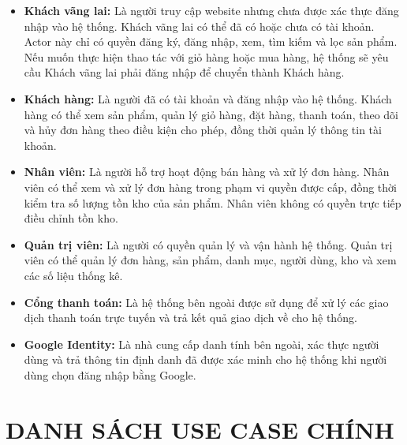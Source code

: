 \documentclass[12pt,a4paper]{article}
\begin{document}
\begin{itemize}

 \item \textbf{Khách vãng lai:} Là người truy cập website nhưng chưa được xác thực đăng nhập vào hệ thống. Khách vãng lai có thể đã có hoặc chưa có tài khoản. Actor này chỉ có quyền đăng ký, đăng nhập, xem, tìm kiếm và lọc sản phẩm. Nếu muốn thực hiện thao tác với giỏ hàng hoặc mua hàng, hệ thống sẽ yêu cầu Khách vãng lai phải đăng nhập để chuyển thành Khách hàng.

 \item \textbf{Khách hàng:} Là người đã có tài khoản và đăng nhập vào hệ thống. Khách hàng có thể xem sản phẩm, quản lý giỏ hàng, đặt hàng, thanh toán, theo dõi và hủy đơn hàng theo điều kiện cho phép, đồng thời quản lý thông tin tài khoản.

 \item \textbf{Nhân viên:} Là người hỗ trợ hoạt động bán hàng và xử lý đơn hàng. Nhân viên có thể xem và xử lý đơn hàng trong phạm vi quyền được cấp, đồng thời kiểm tra số lượng tồn kho của sản phẩm. Nhân viên không có quyền trực tiếp điều chỉnh tồn kho.

 \item \textbf{Quản trị viên:} Là người có quyền quản lý và vận hành hệ thống. Quản trị viên có thể quản lý đơn hàng, sản phẩm, danh mục, người dùng, kho và xem các số liệu thống kê.

 \item \textbf{Cổng thanh toán:} Là hệ thống bên ngoài được sử dụng để xử lý các giao dịch thanh toán trực tuyến và trả kết quả giao dịch về cho hệ thống.

 \item \textbf{Google Identity:} Là nhà cung cấp danh tính bên ngoài, xác thực người dùng và trả thông tin định danh đã được xác minh cho hệ thống khi người dùng chọn đăng nhập bằng Google.

\end{itemize}

\section{DANH SÁCH USE CASE CHÍNH}
\end{document}
